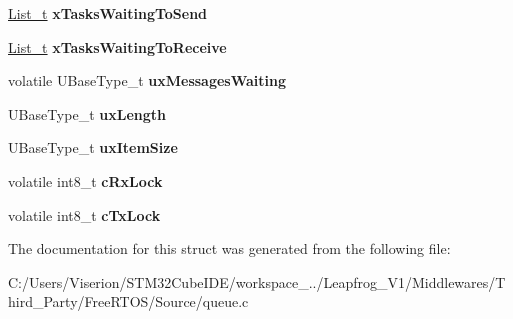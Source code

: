 \begin{DoxyCompactItemize}
\begin{tabbing}
\end{tabbing}\item 
\mbox{\label{struct_queue_definition_aaab135c4345cb0393d6ff3cd5164c7b2}} 
\mbox{\hyperlink{structx_l_i_s_t}{List\+\_\+t}} {\bfseries x\+Tasks\+Waiting\+To\+Send}
\item 
\mbox{\label{struct_queue_definition_af6d61526f77beee659cd604a0c473359}} 
\mbox{\hyperlink{structx_l_i_s_t}{List\+\_\+t}} {\bfseries x\+Tasks\+Waiting\+To\+Receive}
\item 
\mbox{\label{struct_queue_definition_a12b07a40152d0f21488ca06d362d13d1}} 
volatile U\+Base\+Type\+\_\+t {\bfseries ux\+Messages\+Waiting}
\item 
\mbox{\label{struct_queue_definition_ae80d17a812c669d4d41265b7f693988c}} 
U\+Base\+Type\+\_\+t {\bfseries ux\+Length}
\item 
\mbox{\label{struct_queue_definition_a81bb7d3826909244baa9debf5a55abb0}} 
U\+Base\+Type\+\_\+t {\bfseries ux\+Item\+Size}
\item 
\mbox{\label{struct_queue_definition_ac750a3f75a6e174adbc697e473a0dd13}} 
volatile int8\+\_\+t {\bfseries c\+Rx\+Lock}
\item 
\mbox{\label{struct_queue_definition_a24ac3f0707f098da2a22244d843fcf82}} 
volatile int8\+\_\+t {\bfseries c\+Tx\+Lock}
\end{DoxyCompactItemize}


The documentation for this struct was generated from the following file\+:\begin{DoxyCompactItemize}
\item 
C\+:/\+Users/\+Viserion/\+S\+T\+M32\+Cube\+I\+D\+E/workspace\+\_../\+Leapfrog\+\_\+\+V1/\+Middlewares/\+Third\+\_\+\+Party/\+Free\+R\+T\+O\+S/\+Source/queue.\+c\end{DoxyCompactItemize}
